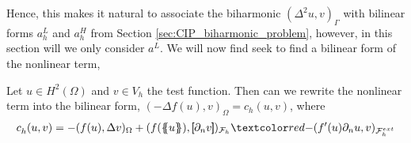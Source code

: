 Hence, this makes it natural to associate the biharmonic $( \Delta ^2 u,v)_{\Gamma } $ with bilinear forms $a_h^{L} $ and $a^{H}_{h} $ from Section \ref{sec:CIP_biharmonic_problem}, however, in this section will we only consider $a^{L}$.
We will now find seek to find a bilinear form of the nonlinear term,

\begin{lemma}
    Let $u \in H^2( \Omega ) $ and $v \in V_{h}$ the test function.
Then can we rewrite the nonlinear term into the bilinear form, $( -\Delta f( u) , v)_{\Omega } = c_{h}(u,v )   $, where
\[
    c^{}_{h} ( u,v) = - ( f( u), \Delta v )_{ \Omega } + ( f( \mean{ u }  ), \jump{ \partial _{n} v }   )_{\mathcal{F}_{h} }  \red{- ( f' (  u  )  \partial _{n}u ,  v      )_{\mathcal{F}_{h} ^{ext}}}
\]

\end{lemma}

